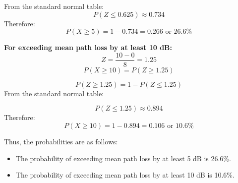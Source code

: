 \documentclass[12pt]{article}
\begin{document}
	
	From the standard normal table:	
	\[	P(Z \leq 0.625) \approx 0.734\]
	Therefore:	
	\[	P(X \geq 5) = 1 - 0.734 = 0.266 \text{ or } 26.6\% \]
	
	\vspace{0.5cm}
	
	\textbf{For exceeding mean path loss by at least 10 dB:}
	\[Z = \frac{10 - 0}{8} = 1.25\]
	\[P(X \geq 10) = P(Z \geq 1.25)\]
	
	\[P(Z \geq 1.25) = 1 - P(Z \leq 1.25)	\]
	From the standard normal table:
	
	\[P(Z \leq 1.25) \approx 0.894\]
	Therefore:
	\[P(X \geq 10) = 1 - 0.894 = 0.106 \text{ or } 10.6\%\]
	\vspace{0.5cm}
	
	Thus, the probabilities are as follows:
	
	\begin{itemize}
		\item The probability of exceeding mean path loss by at least 5 dB is 26.6\%.
		\item The probability of exceeding mean path loss by at least 10 dB is 10.6\%.
	\end{itemize}
	
\end{document}
